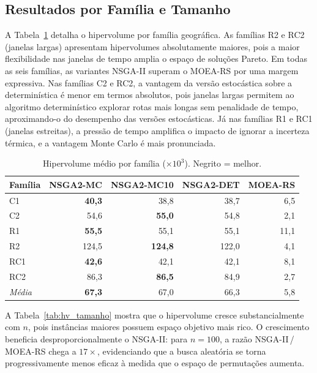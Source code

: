 \documentclass[a4paper,11pt]{article}
\newcommand{\nsmc}{NSGA2\mbox{-}MC\xspace}
\newcommand{\nsmx}{NSGA2\mbox{-}MC10\xspace}
\newcommand{\nsdet}{NSGA2\mbox{-}DET\xspace}
\newcommand{\moers}{MOEA\mbox{-}RS\xspace}
\begin{document}
\subsection{Resultados por Família e Tamanho}

A Tabela~\ref{tab:hv_familia} detalha o hipervolume por família geográfica.
As famílias R2 e RC2 (janelas largas) apresentam hipervolumes absolutamente
maiores, pois a maior flexibilidade nas janelas de tempo amplia o espaço de
soluções Pareto.
Em todas as seis famílias, as variantes NSGA-II superam o \moers por uma
margem expressiva.
Nas famílias C2 e RC2, a vantagem da versão estocástica sobre a determinística
é menor em termos absolutos, pois janelas largas permitem ao algoritmo
determinístico explorar rotas mais longas sem penalidade de tempo,
aproximando-o do desempenho das versões estocásticas.
Já nas famílias R1 e RC1 (janelas estreitas), a pressão de tempo
amplifica o impacto de ignorar a incerteza térmica, e a vantagem
Monte Carlo é mais pronunciada.

\begin{table}[ht]
\centering
\caption{Hipervolume médio por família ($\times 10^3$). Negrito = melhor.}
\label{tab:hv_familia}
\begin{tabular}{lrrrr}
\toprule
\textbf{Família} & \textbf{\nsmc} & \textbf{\nsmx} & \textbf{\nsdet} & \textbf{\moers} \\
\midrule
C1  & \textbf{40,3} & 38,8 & 38,7 &  6,5 \\
C2  & 54,6 & \textbf{55,0} & 54,8 &  2,1 \\
R1  & \textbf{55,5} & 55,1 & 55,1 & 11,1 \\
R2  & 124,5 & \textbf{124,8} & 122,0 &  4,1 \\
RC1 & \textbf{42,6} & 42,1 & 42,1 &  8,1 \\
RC2 & 86,3 & \textbf{86,5} & 84,9 &  2,7 \\
\midrule
\textit{Média} & \textbf{67,3} & 67,0 & 66,3 & 5,8 \\
\bottomrule
\end{tabular}
\end{table}

A Tabela~\ref{tab:hv_tamanho} mostra que o hipervolume cresce substancialmente
com $n$, pois inst\^ancias maiores possuem espaço objetivo mais rico.
O crescimento beneficia desproporcionalmente o NSGA-II: para $n=100$, a razão
NSGA-II\,/\,\moers chega a $17\times$, evidenciando que a busca aleatória se
torna progressivamente menos eficaz à medida que o espaço de permutações
aumenta.
\end{document}
